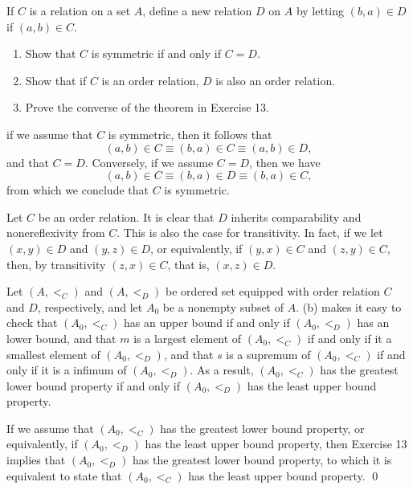 \documentclass[a4paper,12pt]{article}
\begin{document}
\begin{exe}
	If \( C \) is a relation on a set \( A \),
	define a new relation \( D \) on \( A \) by letting \( (b,a) \in D \)
	if \( (a,b)\in C \).
	\begin{enumerate}
		\item
		      Show that \( C \) is symmetric if and only if \( C=D \).
		      
		\item
		      Show that if \( C \) is an order relation,
		      \( D \) is also an order relation.
		      
		\item
		      Prove the converse of the theorem in Exercise 13.
	\end{enumerate}
\end{exe}\begin{sol}\leavevmode \par
	if we assume that \( C \) is symmetric, then it follows that 
	\begin{equation*}
		(a,b) \in C
		\equiv
		(b,a) \in C
		\equiv
		(a,b) \in D,
	\end{equation*}
	and that
	\( C=D \).
	Conversely, if we assume
	\( C=D \),
	then we have
	\begin{equation*}
		(a,b)\in C
		\equiv
		(b,a) \in D
		\equiv
		(b,a) \in C,
	\end{equation*}
	from which we conclude that \( C \) is symmetric.
	
	Let \( C \) be an order relation.
	It is clear that
	\( D \) inherits comparability and nonereflexivity from \( C \).
	This is also the case for transitivity.
	In fact, if we let
	\( (x,y) \in D \)
	and
	\( (y,z) \in D \),
	or equivalently, if
	\( (y,x) \in C \)
	and
	\( (z,y) \in C \),
	then, by transitivity
	\( (z,x) \in C \),
	that is,
	\( (x,z) \in D \).
	
	Let
	\( (A,<_{C})\)
	and
	\( (A,<_{D}) \)
	be ordered set equipped with order relation
	\( C\)
	and
	\( D \),
	respectively,
	and let
	\( A_0 \) be a nonempty subset of
	\( A \).
	(b) makes it easy to check that
	\( (A_0, <_{C})\)
	has an upper bound if and only if
	\( (A_0, <_{D})\)
	has an lower bound,
	and that
	\( m \)
	is a largest element of
	\( (A_0, <_{C})\)
	if and only if it a smallest element of
	\( (A_0, <_{D})\),
	and that
	\( s \) is a supremum of \( (A_0, <_{C})\)
	if and only if it is a infimum of \( (A_0, <_{D})\).
	As a result,
	\( (A_0, <_{C})\)
	has the greatest lower bound property if and only if
	\( (A_0, <_{D})\)
	has the least upper bound property.
	
	If we assume that
	\( (A_0, <_{C})\)
	has the greatest lower bound property,
	or equivalently, if
	\( (A_0, <_{D})\)
	has the least upper bound property,
	then Exercise 13 implies that
	\( (A_0, <_{D})\)
	has the greatest lower bound property,
	to which it is equivalent to state that
	\( (A_0, <_{C})\)
	has the least upper bound property.
	\qed\end{sol}
\end{document}
